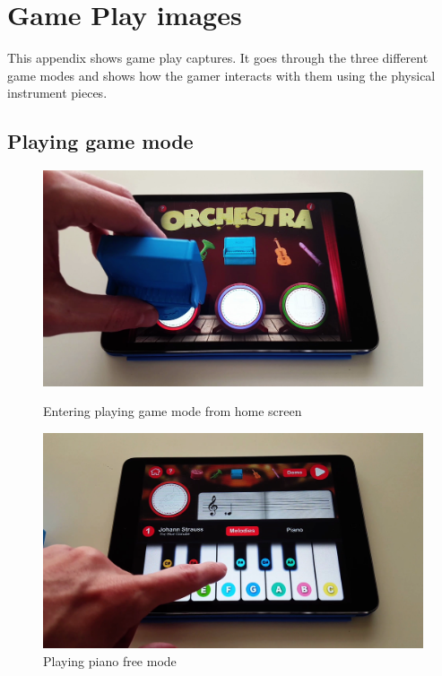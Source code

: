 \cleardoublepage
\chapter{Game Play images}

This appendix shows game play captures. It goes through the three different game modes and shows how the gamer interacts with them using the physical instrument pieces.

\cleardoublepage

\section{Playing game mode}

\begin{figure}[ht!]
  \centering
  \includegraphics[width=350pt]{graphics/game-play/enter_playing_mode.png}
  \vspace{0.05cm}
  \caption{Entering playing game mode from home screen}
  \vspace{1cm}

  \includegraphics[width=350pt]{graphics/game-play/playing_piano_free.png}
  \vspace{0.05cm}
  \caption{Playing piano free mode}
\end{figure}

